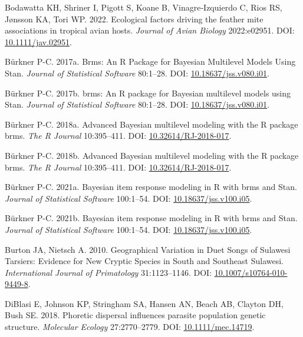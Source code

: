 \documentclass[10pt,a4paper]{article}
\newlength{\cslhangindent}
\newenvironment{CSLReferences}[2] %
 {\begin{list}{}{%
  \setlength{\itemindent}{0pt}
  \setlength{\leftmargin}{0pt}
  \setlength{\parsep}{0pt}
  \ifodd #1
   \setlength{\leftmargin}{\cslhangindent}
   \setlength{\itemindent}{-1\cslhangindent}
  \fi
  \setlength{\itemsep}{#2\baselineskip}}}
 {\end{list}}
\begin{document}
\begin{CSLReferences}{1}{0}
Bodawatta KH, Shriner I, Pigott S, Koane B, Vinagre‐Izquierdo C, Rios RS, Jønsson KA, Tori WP. 2022. Ecological factors driving the feather mite associations in tropical avian hosts. \emph{Journal of Avian Biology} 2022:e02951. DOI: \href{https://doi.org/10.1111/jav.02951}{10.1111/jav.02951}.

Bürkner P-C. 2017a. Brms: {An} {R} {Package} for {Bayesian} {Multilevel} {Models} {Using} {Stan}. \emph{Journal of Statistical Software} 80:1--28. DOI: \href{https://doi.org/10.18637/jss.v080.i01}{10.18637/jss.v080.i01}.

Bürkner P-C. 2017b. {brms}: An {R} package for {Bayesian} multilevel models using {Stan}. \emph{Journal of Statistical Software} 80:1--28. DOI: \href{https://doi.org/10.18637/jss.v080.i01}{10.18637/jss.v080.i01}.

Bürkner P-C. 2018a. Advanced {Bayesian} multilevel modeling with the {R} package {brms}. \emph{The R Journal} 10:395--411. DOI: \href{https://doi.org/10.32614/RJ-2018-017}{10.32614/RJ-2018-017}.

Bürkner P-C. 2018b. Advanced {Bayesian} multilevel modeling with the {R} package {brms}. \emph{The R Journal} 10:395--411. DOI: \href{https://doi.org/10.32614/RJ-2018-017}{10.32614/RJ-2018-017}.

Bürkner P-C. 2021a. Bayesian item response modeling in {R} with {brms} and {Stan}. \emph{Journal of Statistical Software} 100:1--54. DOI: \href{https://doi.org/10.18637/jss.v100.i05}{10.18637/jss.v100.i05}.

Bürkner P-C. 2021b. Bayesian item response modeling in {R} with {brms} and {Stan}. \emph{Journal of Statistical Software} 100:1--54. DOI: \href{https://doi.org/10.18637/jss.v100.i05}{10.18637/jss.v100.i05}.

Burton JA, Nietsch A. 2010. Geographical {Variation} in {Duet} {Songs} of {Sulawesi} {Tarsiers}: {Evidence} for {New} {Cryptic} {Species} in {South} and {Southeast} {Sulawesi}. \emph{International Journal of Primatology} 31:1123--1146. DOI: \href{https://doi.org/10.1007/s10764-010-9449-8}{10.1007/s10764-010-9449-8}.

DiBlasi E, Johnson KP, Stringham SA, Hansen AN, Beach AB, Clayton DH, Bush SE. 2018. Phoretic dispersal influences parasite population genetic structure. \emph{Molecular Ecology} 27:2770--2779. DOI: \href{https://doi.org/10.1111/mec.14719}{10.1111/mec.14719}.


\end{CSLReferences}
\end{document}
